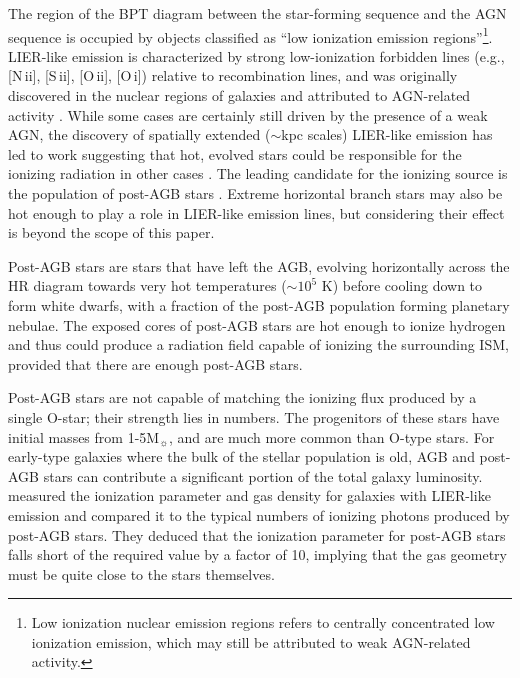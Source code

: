\documentclass[twocolumn, tighten]{aastex61}
\newcommand{\nii}{[N\,{\sc ii}]\xspace}
\newcommand{\sii}{[S\,{\sc ii}]\xspace}
\newcommand{\oii}{[O\,{\sc ii}]\xspace}
\newcommand{\oi}{[O\,{\sc i}]\xspace}
\newcommand\Msun{\ensuremath{\mathrm{M_{\sun}}}}
\begin{document}
The region of the BPT diagram between the star-forming sequence and the AGN sequence is occupied by objects classified as ``low ionization emission regions''\citep[LIERs, ][]{Belfiore16}\footnote{Low ionization nuclear emission regions \citep[LINERs, ][]{Heckman1980} refers to centrally concentrated low ionization emission, which may still be attributed to weak AGN-related activity.}. LIER-like emission is characterized by strong low-ionization forbidden lines (e.g., \nii{}, \sii{}, \oii{}, \oi{}) relative to recombination lines, and was originally discovered in the nuclear regions of galaxies and attributed to AGN-related activity \citep{Kauffmann03b, Kewley06, Ho08}. While some cases are certainly still driven by the presence of a weak AGN, the discovery of spatially extended (${\sim}$kpc scales) LIER-like emission has led to work suggesting that hot, evolved stars could be responsible for the ionizing radiation in other cases \citep{Singh13, Belfiore16}. The leading candidate for the ionizing source is the population of post-AGB stars \citep{Binette94, Sarzi10, Yan12}. Extreme horizontal branch stars may also be hot enough to play a role in LIER-like emission lines, but considering their effect is beyond the scope of this paper.

Post-AGB stars are stars that have left the AGB, evolving horizontally across the HR diagram towards very hot temperatures ($\sim10^5$ K) before cooling down to form white dwarfs, with a fraction of the post-AGB population forming planetary nebulae. The exposed cores of post-AGB stars are hot enough to ionize hydrogen and thus could produce a radiation field capable of ionizing the surrounding ISM, provided that there are enough post-AGB stars. 

Post-AGB stars are not capable of matching the ionizing flux produced by a single O-star; their strength lies in numbers. The progenitors of these stars have initial masses from 1-5\Msun{}, and are much more common than O-type stars. For early-type galaxies where the bulk of the stellar population is old, AGB and post-AGB stars can contribute a significant portion of the total galaxy luminosity. \citet{Yan12} measured the ionization parameter and gas density for galaxies with LIER-like emission and compared it to the typical numbers of ionizing photons produced by post-AGB stars. They deduced that the ionization parameter for post-AGB stars falls short of the required value by a factor of 10, implying that the gas geometry must be quite close to the stars themselves.
\end{document}
